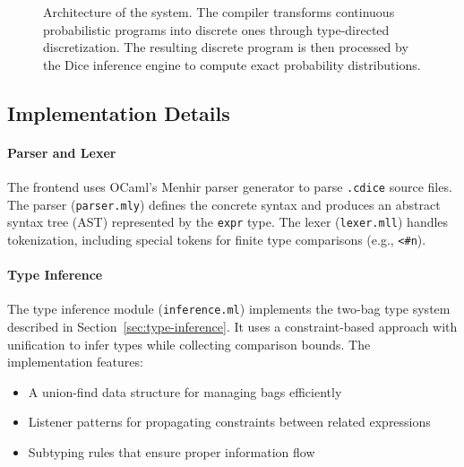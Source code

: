 \begin{figure}[h]
\caption{Architecture of the \Slice{} system. The \Slice{} compiler transforms continuous probabilistic programs into discrete ones through type-directed discretization. The resulting discrete program is then processed by the Dice inference engine to compute exact probability distributions.}
\label{fig:architecture}
\end{figure}

\subsection{Implementation Details}

\paragraph{Parser and Lexer} The frontend uses OCaml's Menhir parser generator to parse \texttt{.cdice} source files. The parser (\texttt{parser.mly}) defines the concrete syntax and produces an abstract syntax tree (AST) represented by the \texttt{expr} type. The lexer (\texttt{lexer.mll}) handles tokenization, including special tokens for finite type comparisons (e.g., \texttt{<\#n}).

\paragraph{Type Inference} The type inference module (\texttt{inference.ml}) implements the two-bag type system described in Section~\ref{sec:type-inference}. It uses a constraint-based approach with unification to infer types while collecting comparison bounds. The implementation features:
\begin{itemize}
    \item A union-find data structure for managing bags efficiently
    \item Listener patterns for propagating constraints between related expressions
    \item Subtyping rules that ensure proper information flow
\end{itemize}

